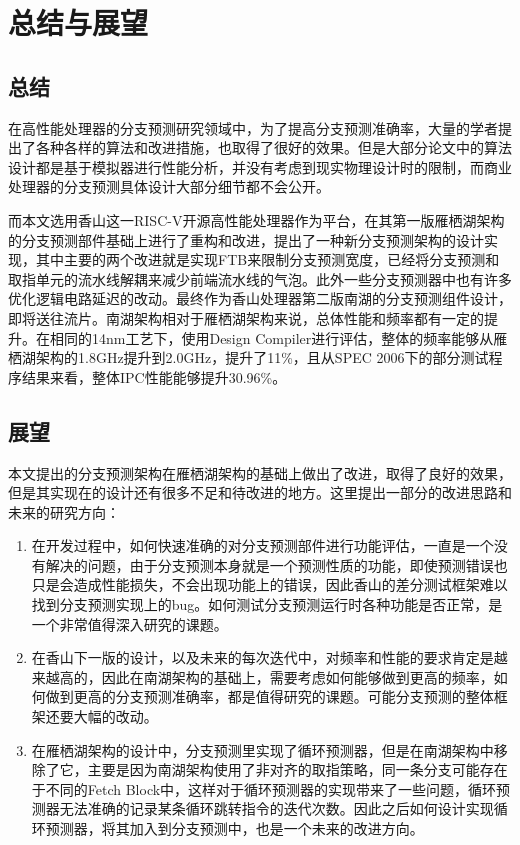 
\chapter{总结与展望}

\section{总结}

在高性能处理器的分支预测研究领域中，为了提高分支预测准确率，大量的学者提出了各种各样的算法和改进措施，也取得了很好的效果。但是大部分论文中的算法设计都是基于模拟器进行性能分析，并没有考虑到现实物理设计时的限制，而商业处理器的分支预测具体设计大部分细节都不会公开。

而本文选用香山这一RISC-V开源高性能处理器作为平台，在其第一版雁栖湖架构的分支预测部件基础上进行了重构和改进，提出了一种新分支预测架构的设计实现，其中主要的两个改进就是实现FTB来限制分支预测宽度，已经将分支预测和取指单元的流水线解耦来减少前端流水线的气泡。此外一些分支预测器中也有许多优化逻辑电路延迟的改动。最终作为香山处理器第二版南湖的分支预测组件设计，即将送往流片。南湖架构相对于雁栖湖架构来说，总体性能和频率都有一定的提升。在相同的14nm工艺下，使用Design Compiler进行评估，整体的频率能够从雁栖湖架构的1.8GHz提升到2.0GHz，提升了11\%，且从SPEC 2006下的部分测试程序结果来看，整体IPC性能能够提升30.96\%。

\section{展望}

本文提出的分支预测架构在雁栖湖架构的基础上做出了改进，取得了良好的效果，但是其实现在的设计还有很多不足和待改进的地方。这里提出一部分的改进思路和未来的研究方向：

\begin{enumerate}
    \item 在开发过程中，如何快速准确的对分支预测部件进行功能评估，一直是一个没有解决的问题，由于分支预测本身就是一个预测性质的功能，即使预测错误也只是会造成性能损失，不会出现功能上的错误，因此香山的差分测试框架难以找到分支预测实现上的bug。如何测试分支预测运行时各种功能是否正常，是一个非常值得深入研究的课题。
    \item 在香山下一版的设计，以及未来的每次迭代中，对频率和性能的要求肯定是越来越高的，因此在南湖架构的基础上，需要考虑如何能够做到更高的频率，如何做到更高的分支预测准确率，都是值得研究的课题。可能分支预测的整体框架还要大幅的改动。
    \item 在雁栖湖架构的设计中，分支预测里实现了循环预测器，但是在南湖架构中移除了它，主要是因为南湖架构使用了非对齐的取指策略，同一条分支可能存在于不同的Fetch Block中，这样对于循环预测器的实现带来了一些问题，循环预测器无法准确的记录某条循环跳转指令的迭代次数。因此之后如何设计实现循环预测器，将其加入到分支预测中，也是一个未来的改进方向。
\end{enumerate}

